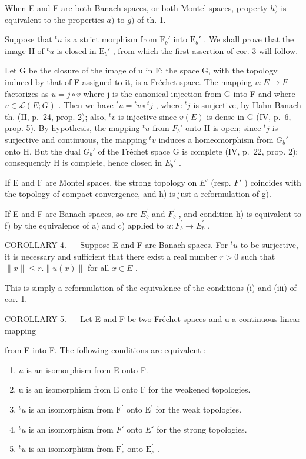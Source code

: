When E and F are both Banach spaces, or both Montel spaces, property \(h)\) is equivalent to the properties \(a)\) to \(g)\) of th. 1.

Suppose that \({}^t u\) is a strict morphism from \(\mathrm{F}_b'\) into \(\mathrm{E}_b'\) . We shall prove that the image H of \({}^t u\) is closed in \(\mathrm{E}_b'\) , from which the first assertion of cor. 3 will follow.

Let G be the closure of the image of u in F; the space G, with the topology induced by that of F assigned to it, is a Fréchet space. The mapping \(u: E \to F\) factorizes as \(u = j \circ v\) where j is the canonical injection from G into F and where \(v \in \mathcal{L}(E; G)\) . Then we have \({}^t u = {}^t v \circ {}^t j\) , where \({}^t j\) is surjective, by Hahn-Banach th. (II, p.~24, prop. 2); also, \({}^t v\) is injective since \(v(E)\) is dense in G (IV, p.~6, prop. 5). By hypothesis, the mapping \({}^t u\) from \(F_{b}'\) onto H is open; since \({}^t j\) is surjective and continuous, the mapping \({}^t v\) induces a homeomorphism from \(G_{b}'\) onto H. But the dual \(G_{b}'\) of the Fréchet space G is complete (IV, p.~22, prop. 2); consequently H is complete, hence closed in \(E_{b}'\) .

If E and F are Montel spaces, the strong topology on \(E'\) (resp. \(F'\) ) coincides with the topology of compact convergence, and h) is just a reformulation of g).

If E and F are Banach spaces, so are \(E_{b}^{\prime}\) and \(F_{b}^{\prime}\) , and condition h) is equivalent to f) by the equivalence of a) and c) applied to \(u: F_{b}^{\prime} \to E_{b}^{\prime}\) .

COROLLARY 4. --- Suppose E and F are Banach spaces. For \({}^t u\) to be surjective, it is necessary and sufficient that there exist a real number \(r > 0\) such that \(\| x\| \leqslant r.\| u(x)\|\) for all \(x\in E\) .

This is simply a reformulation of the equivalence of the conditions (i) and (iii) of cor. 1.

COROLLARY 5. --- Let E and F be two Fréchet spaces and u a continuous linear mapping

from E into F. The following conditions are equivalent :

\begin{enumerate}
\def\labelenumi{\alph{enumi})}
\item
  \(u\) is an isomorphism from E onto F.
\item
  u is an isomorphism from E onto F for the weakened topologies.
\item
  \({}^t u\) is an isomorphism from \({\mathrm{F}}^{\prime }\) onto \({\mathrm{E}}^{\prime }\) for the weak topologies.
\item
  \({}^{t}u\) is an isomorphism from \(F'\) onto \(E'\) for the strong topologies.
\item
  \({}^t u\) is an isomorphism from \({\mathrm{F}}_{c}^{\prime }\) onto \({\mathrm{E}}_{c}^{\prime }\) .
\end{enumerate}

